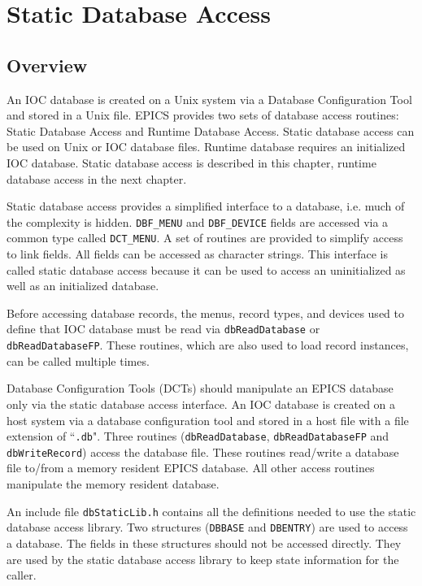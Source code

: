 \chapter{Static Database Access}

\section{Overview}

An IOC database is created on a Unix system via a Database Configuration Tool and stored in a Unix file.
EPICS provides two sets of database access routines:
Static Database Access and Runtime Database Access.
Static database access can be used on Unix or IOC database files.
Runtime database requires an initialized IOC database.
Static database access is described in this chapter, runtime database access in the next chapter.

Static database access provides a simplified interface to a database, i.e. much of the complexity is hidden.
\verb|DBF_MENU| and \verb|DBF_DEVICE| fields are accessed via a common type called \verb|DCT_MENU|.
A set of routines are provided to simplify access to link fields.
All fields can be accessed as character strings.
This interface is called static database access because it can be used to access an uninitialized as well as an initialized database.

Before accessing database records, the menus, record types, and devices used to define that IOC database must be read via \verb|dbReadDatabase| or \verb|dbReadDatabaseFP|.
These routines, which are also used to load record instances, can be called multiple times.

Database Configuration Tools (DCTs) should manipulate an EPICS database only via the static database access interface.
An IOC database is created on a host system via a database configuration tool and stored in a host file with a file extension of ``\verb|.db|".
Three routines (\verb|dbReadDatabase|, \verb|dbReadDatabaseFP| and \verb|dbWriteRecord|) access the database file.
These routines read/write a database file to/from a memory resident EPICS database.
All other access routines manipulate the memory resident database.

An include file \verb|dbStaticLib.h| contains all the definitions needed to use the static database access library.
Two structures (\verb|DBBASE| and \verb|DBENTRY|) are used to access a database.
The fields in these structures should not be accessed directly.
They are used by the static database access library to keep state information for the caller.

